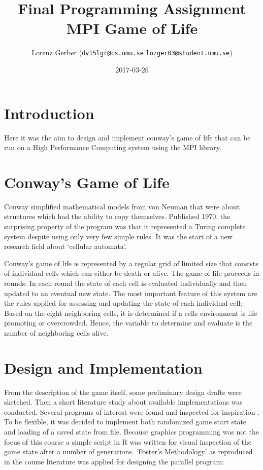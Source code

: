 \documentclass[a4paper,11pt,twoside,table,xcdraw]{article}
\title{Final Programming Assignment\\ MPI Game of Life}
\author{Lorenz Gerber ({\tt{dv15lgr@cs.umu.se}} {\tt{lozger03@student.umu.se}})}
\date{2017-03-26}
\begin{document}
\lstset{language=C}
\maketitle
\thispagestyle{empty}
\newpage
\tableofcontents
\thispagestyle{empty}
\newpage

\clearpage
{}

\section{Introduction}
Here it was the aim to design and implement conway's game of life that can be run on a High Performance Computing system using the MPI library. 
\section{Conway's Game of Life}
Conway simplified mathematical models from von Neuman that were about structures which had the ability to copy themselves. Published 1970, the surprising property of the program was that it represented a Turing complete system despite using only very few simple rules. It was the start of a new research field about `cellular automata'.

Conway's game of life is represented by a regular grid of limited size that consists of individual cells which can either be death or alive. The game of life proceeds in rounds: In each round the state of each cell is evaluated individually and then updated to an eventual new state. The most important feature of this system are the rules applied for assessing and updating the state of each individual cell: Based on the eight neighboring cells, it is determined if a cells environment is life promoting or overcrowded. Hence, the variable to determine and evaluate is the number of neighboring cells alive.

\section{Design and Implementation}
From the description of the game itself, some preliminary design drafts were sketched. Then a short literature study about available implementations was conducted. Several programs of interest were found and inspected for inspiration \cite{golRosetta} \cite{golKTH} \cite{golPetascale}. 
To be flexible, it was decided to implement both randomized game start state and loading of a saved state from file. Because graphics programming was not the focus of this course a simple script in R \cite{rlanguage} was written for visual inspection of the game state after a number of generations. 
`Foster's Methodology' as reproduced in the course literature \cite[p. 66]{pacheco2011} was applied for designing the parallel program:
\end{document}
